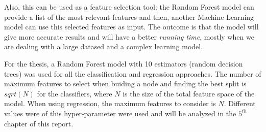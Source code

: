 Also, this can be used as a feature selection tool: the Random Forest model 
can provide a list of the most relevant features and then, another Machine 
Learning model can use this selected features as input. The outcome is that the 
model will give more accurate results and will have a better {\it running time}, 
mostly when we are dealing with a large datased and a complex learning model.

For the thesis, a Random Forest model with 10 estimators (random decision trees) 
was used for all the classification and regression approaches. The number of 
maximum features to select when buiding a node and finding the best split is 
$sqrt(N)$ for the classifiers, where $N$ is the size of the total feature 
space of the model. When using regression, the maximum features to consider 
is $N$. Different values were of this hyper-parameter were used and will be 
analyzed in the $5^{th}$ chapter of this report. 
